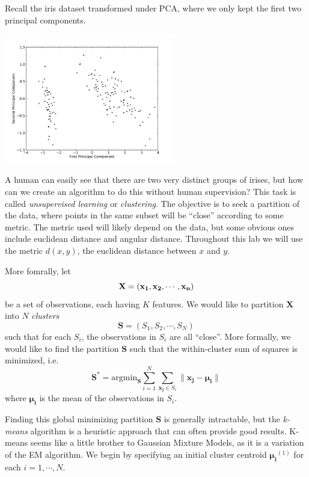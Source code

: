 

Recall the iris dataset transformed under PCA, where we only kept the first two principal components.

\begin{center}
\includegraphics[width=7.5cm]{irispca.jpg}
\end{center}

A human can easily see that there are two very distinct groups of irises, but how can we create an algorithm to do this without human supervision? This task is called \emph{unsupervised learning} or \emph{clustering}. The objective is to seek a partition of the data, where points in the same subset will be ``close'' according to some metric. The metric used will likely depend on the data, but some obvious ones include euclidean distance and angular distance. Throughout this lab we will use the metric $d(x,y)$, the euclidean distance between $x$ and $y$.

More fomrally, let $$\mathbf{X} = \left( \mathbf{x_{1}}, \mathbf{x_{2}}, \cdots, \mathbf{{\bf x}_{n}}\right)$$ be a set of observations, each having $K$ features. We would like to partition $\mathbf{X}$ into $N$ \emph{clusters} $$\mathbf{S} = \left( S_{1}, S_{2}, \cdots, S_{N}\right)$$ such that for each $S_{i}$, the observations in $S_{i}$ are all ``close''. More formally, we would like to find the partition $\mathbf{S}$ such that the within-cluster sum of squares is minimized, i.e. $$\mathbf{S^{*}} = \text{argmin}_{\mathbf{S}} \sum_{i=1}^{N} \sum_{\mathbf{x_{j}} \in S_{i}} \| \mathbf{x_{j}} - \mathbf{\mu_{i}}\|$$ where $\mathbf{\mu_{i}}$ is the mean of the observations in $S_{i}$.

Finding this global minimizing partition $\mathbf{S}$ is generally intractable, but the \emph{k-means} algorithm is a heuristic approach that can often provide good results. K-means seems like a little brother to Gaussian Mixture Models, as it is a variation of the EM algorithm. We begin by specifying an initial cluster centroid $\mathbf{\mu_{i}}^{(1)}$ for each $i = 1, \cdots, N$.

